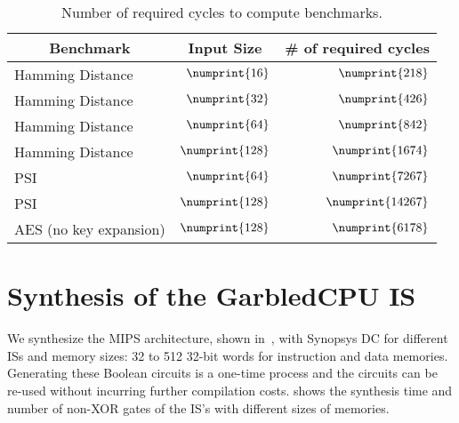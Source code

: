 \begin{table}[ht]
\caption{Number of required cycles to compute benchmarks.}\label{tab:cyc_bench}
\centering
\small
\begin{tabular}{l|r|r}
\multicolumn{1}{c|}{Benchmark} & \multicolumn{1}{c|}{Input Size} &  \multicolumn{1}{c}{\# of required cycles} \\
\hline
\hline
Hamming Distance & $\numprint{16}$ & $\numprint{218}$\\
\hline
 Hamming Distance & $\numprint{32}$ & $\numprint{426}$\\
\hline
Hamming Distance & $\numprint{64}$ & $\numprint{842}$\\
\hline
Hamming Distance & $\numprint{128}$ & $\numprint{1674}$\\
\hline
PSI & $\numprint{64}$ &$\numprint{7267}$\\
\hline
PSI & $\numprint{128}$ &$\numprint{14267}$\\
\hline
AES (no key expansion) & $\numprint{128}$ & $\numprint{6178}$\\
\end{tabular}
\end{table}

\section{Synthesis of the GarbledCPU IS}
We synthesize the MIPS architecture, shown in~, with Synopsys DC for different ISs and memory sizes: 32 to 512 32-bit words for instruction and data memories. Generating these Boolean circuits is a one-time process and the circuits can be re-used without incurring further compilation costs.  shows the synthesis time and number of non-XOR gates of the IS's with different sizes of memories.

